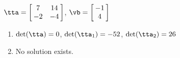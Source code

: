 {$\tta = \left[\hskip -3pt \begin{array}{cc} 7&14\\  -2&-4\end {array} \hskip -3pt
 \right] $,
 \quad
$\vb = \left[\hskip -3pt \begin{array}{c} -1\\  4\end{array}\hskip -3pt \right]$}
{\begin{enumerate}
\item	$\det(\tta) = 0$, $\det(\tta_1) = -52$, $\det(\tta_2) = 26$
\item No solution exists.
\end{enumerate}
}
 


 

